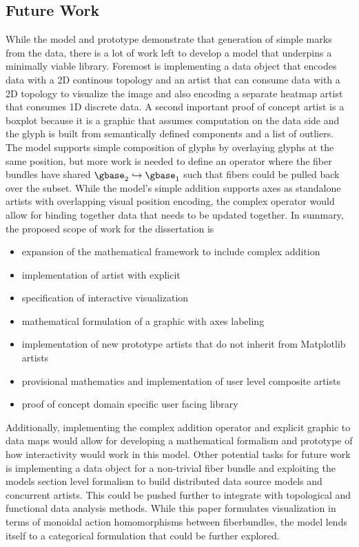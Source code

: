 \documentclass[../main.tex]{subfiles}
\begin{document}
\subsection{Future Work}
While the model and prototype demonstrate that generation of simple marks from the data, there is a lot of work left to develop a model that underpins a minimally viable library. Foremost is implementing a data object that encodes data with a 2D continous topology and an artist that can consume data with a 2D topology to visualize the image\cite{toryRethinkingVisualizationHighLevel2004,haber1990visualization,hansen2011visualization} and also encoding a separate heatmap\cite{wilkinsonHistoryClusterHeat2009,loua1873atlas} artist that consumes 1D discrete data.  A second important proof of concept artist is a boxplot\cite{wickham40YearsBoxplots2011} because it is a graphic that assumes computation on the data side and the glyph is built from semantically defined components and a list of outliers. The model supports simple composition of glyphs by overlaying glyphs at the same position, but more work is needed to define an operator where the fiber bundles have shared $\gbase_2 \hookrightarrow \gbase_1$ such that fibers could be pulled back over the subset. While the model's simple addition supports axes as standalone artists with overlapping visual position encoding, the complex operator would allow for binding together data that needs to be updated together.
In summary, the proposed scope of work for the dissertation is
\begin{itemize}
    \item expansion of the mathematical framework to include complex addition
    \item implementation of artist with explicit \vindex\
    \item specification of interactive visualization
    \item mathematical formulation of a graphic with axes labeling
    \item implementation of new prototype artists that do not inherit from Matplotlib artists
    \item provisional mathematics and implementation of user level composite artists
    \item proof of concept domain specific user facing library 
\end{itemize}
Additionally, implementing the complex addition operator and explicit graphic to data maps would allow for developing a mathematical formalism and prototype of how interactivity would work in this model. Other potential tasks for future work is implementing a data object for a non-trivial fiber bundle and exploiting the models section level formalism to build distributed data source models and concurrent artists. This could be pushed further to integrate with topological\cite{heineSurveyTopologybasedMethods2016} and functional \cite{ramsayFunctionalDataAnalysis2006a} data analysis methods. While this paper formulates visualization in terms of monoidal action homomorphisms between fiberbundles, the model lends itself to a categorical formulation\cite{fongInvitationAppliedCategory2019,milewskiCategoryTheoryProgrammers} that could be further explored. 
\end{document}
